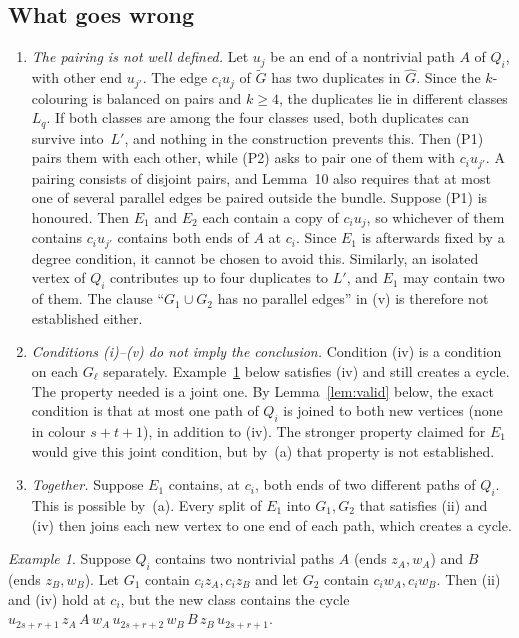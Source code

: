 \documentclass[11pt]{amsart}
\theoremstyle{definition}
\theoremstyle{remark}
\newtheorem{example}[theorem]{Example}
\begin{document}
\subsection{What goes wrong}
\begin{enumerate}[label=(\alph*),leftmargin=*]
\item \emph{The pairing is not well defined.} Let $u_j$ be an end of a nontrivial path $A$ of
$Q_i$, with other end $u_{j'}$. The edge $c_iu_j$ of $\widetilde G$ has two duplicates in
$\widehat G$. Since the $k$-colouring is balanced on pairs and $k\ge4$, the duplicates lie in
different classes $L_q$. If both classes are among the four classes used, both duplicates can
survive into~$L'$, and nothing in the construction prevents this. Then (P1) pairs them with each
other, while (P2) asks to pair one of them with $c_iu_{j'}$. A pairing consists of disjoint
pairs, and Lemma~10 also requires that at most one of several parallel edges be paired outside
the bundle. Suppose (P1) is honoured. Then $E_1$ and $E_2$ each contain a copy of $c_iu_j$, so
whichever of them contains $c_iu_{j'}$ contains both ends of $A$ at $c_i$. Since $E_1$ is
afterwards fixed by a degree condition, it cannot be chosen to avoid this. Similarly, an
isolated vertex of $Q_i$ contributes up to four duplicates to $L'$, and $E_1$ may contain two
of them. The clause ``$G_1\cup G_2$ has no parallel edges'' in (v) is therefore not established
either.
\item \emph{Conditions (i)--(v) do not imply the conclusion.} Condition (iv) is a condition on
each $G_\ell$ separately. Example~\ref{ex:cycle} below satisfies (iv) and still creates a cycle.
The property needed is a joint one. By Lemma~\ref{lem:valid} below, the exact condition is that
at most one path of $Q_i$ is joined to both new vertices (none in colour $s+t+1$), in addition
to (iv). The stronger property claimed for $E_1$ would give this joint condition, but by~(a)
that property is not established.
\item \emph{Together.} Suppose $E_1$ contains, at $c_i$, both ends of two different paths of
$Q_i$. This is possible by~(a). Every split of $E_1$ into $G_1,G_2$ that satisfies (ii) and
(iv) then joins each new vertex to one end of each path, which creates a cycle.
\end{enumerate}

\begin{example}\label{ex:cycle}
Suppose $Q_i$ contains two nontrivial paths $A$ (ends $z_A,w_A$) and $B$ (ends $z_B,w_B$).
Let $G_1$ contain $c_iz_A,c_iz_B$ and let $G_2$ contain $c_iw_A,c_iw_B$. Then (ii) and (iv) hold
at $c_i$, but the new class contains the cycle
$u_{2s+r+1}\,z_A\,A\,w_A\,u_{2s+r+2}\,w_B\,B\,z_B\,u_{2s+r+1}$.
\end{example}
\end{document}
